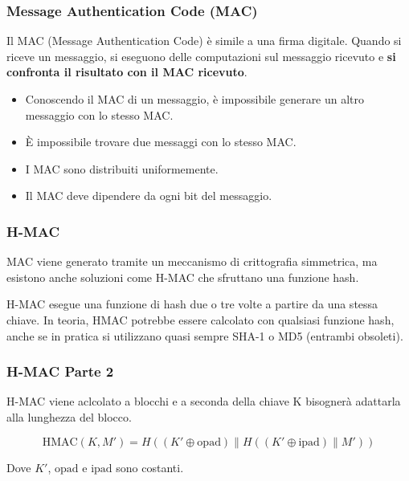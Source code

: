 \begin{frame}
	\frametitle{Message Authentication Code (MAC)}

	Il MAC (Message Authentication Code) è simile a una firma digitale.
	Quando si riceve un messaggio, si eseguono delle computazioni sul messaggio ricevuto e \textbf{si confronta il risultato con il MAC ricevuto}.

	\begin{itemize}
		\item Conoscendo il MAC di un messaggio, è impossibile generare un altro messaggio con lo stesso MAC.
		\item È impossibile trovare due messaggi con lo stesso MAC.
		\item I MAC sono distribuiti uniformemente.
		\item Il MAC deve dipendere da ogni bit del messaggio.
	\end{itemize}
\end{frame}

\begin{frame}
	\frametitle{H-MAC}

	MAC viene generato tramite un meccanismo di crittografia simmetrica, ma esistono anche soluzioni come H-MAC
	che sfruttano una funzione hash.

	\vspace{1cm}

	H-MAC esegue una funzione di hash due o tre volte a partire da una stessa chiave. In teoria, HMAC potrebbe essere
	calcolato con qualsiasi funzione hash, anche se in pratica si utilizzano quasi sempre SHA-1 o MD5 (entrambi obsoleti).


\end{frame}

\begin{frame}
	\frametitle{H-MAC Parte 2}

	H-MAC viene aclcolato a blocchi e a seconda della chiave K bisognerà adattarla alla lunghezza del blocco.

	\[
		\text{HMAC}(K, M') = H((K' \oplus \text{opad}) \| H((K' \oplus \text{ipad}) \| M'))
	\]

	Dove $K'$, $\text{opad}$ e $\text{ipad}$ sono costanti.

\end{frame}

